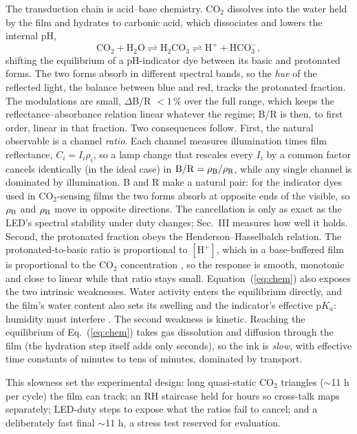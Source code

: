 \documentclass[twocolumn]{revtex4}
\begin{document}
The transduction chain is acid--base chemistry. CO$_2$ dissolves into the
water held by the film and hydrates to carbonic acid, which dissociates and
lowers the internal pH,
\begin{equation}
\mathrm{CO_2 + H_2O \rightleftharpoons H_2CO_3 \rightleftharpoons H^+ +
HCO_3^-},
\label{eq:chem}
\end{equation}
shifting the equilibrium of a pH-indicator dye between its basic and
protonated forms. The two forms absorb in different spectral bands, so
the \emph{hue} of the reflected light, the balance between blue and
red, tracks the protonated fraction. The modulations are small,
$\Delta$B/R $<1\,\%$ over the full range, which keeps the
reflectance--absorbance relation linear whatever the regime; B/R is
then, to first order, linear in that fraction. Two consequences
follow. First, the natural observable is a channel \emph{ratio}. Each
channel measures illumination times film reflectance, $C_i =
I_i\rho_i$, so a lamp change that rescales every $I_i$ by a common
factor cancels identically (in the ideal case) in
$\mathrm{B/R}=\rho_{\rm B}/\rho_{\rm R}$, while any single channel is
dominated by illumination. B and R make a natural pair: for the
indicator dyes used in CO$_2$-sensing films \cite{mills92} the two
forms absorb at opposite ends of the visible, so $\rho_{\rm B}$ and
$\rho_{\rm R}$ move in opposite directions. The cancellation is only as
exact as the LED's spectral stability under duty changes; Sec.~III
measures how well it holds. Second, the protonated fraction obeys the
Henderson--Hasselbalch relation. The protonated-to-basic ratio is
proportional to $[\mathrm{H^+}]$, which in a base-buffered film is
proportional to the CO$_2$ concentration \cite{mills92}, so the
response is smooth, monotonic and close to linear while that ratio
stays small. Equation~(\ref{eq:chem}) also exposes the two intrinsic
weaknesses. Water activity enters the equilibrium directly, and the
film's water content also sets its swelling and the indicator's
effective p$K_a$: humidity must interfere \cite{gonzalez25}. The
second weakness is kinetic. Reaching the equilibrium of
Eq.~(\ref{eq:chem}) takes gas dissolution and diffusion through the
film (the hydration step itself adds only seconds), so the ink is
\emph{slow}, with effective time constants of minutes to tens of
minutes, dominated by transport.

This slowness set the experimental design: long quasi-static
CO$_2$ triangles ($\sim$11 h per cycle) the film can track; an RH
staircase held for hours so cross-talk maps separately; LED-duty steps to
expose what the ratios fail to cancel; and a deliberately fast final
$\sim$11 h, a stress test reserved for evaluation.
\end{document}
